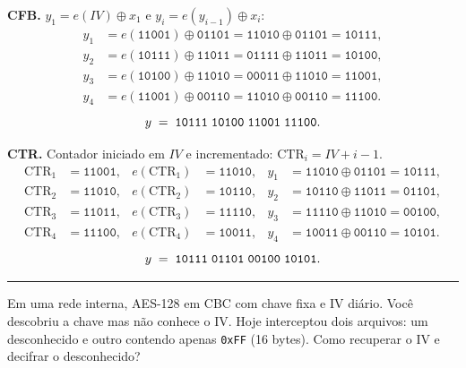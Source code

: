 \documentclass[12pt,a4paper]{article}
\newcommand{\exercicio}[1]{%
    \par\vspace{1.2em}
    \noindent
    {\color{black!55}\rule[-0.25em]{3pt}{1.6em}}%
    \hspace{0.6em}{\Large\bfseries Exerc\'{i}cio #1}
    \par\vspace{-0.4em}
    \noindent{\color{black!35}\rule{\textwidth}{0.4pt}}
    \par\vspace{0.35em}
}
\newenvironment{resposta}{%
    \begin{respostabox}
    \color{red!70!black}\sloppy
}{%
    \end{respostabox}
}
\begin{document}
\begin{resposta}
\textbf{CFB.} $y_1 = e(IV) \oplus x_1$ e $y_i = e(y_{i-1}) \oplus x_i$:
\begin{align*}
y_1 &= e(\texttt{11001})\oplus\texttt{01101} = \texttt{11010}\oplus\texttt{01101} = \texttt{10111},\\
y_2 &= e(\texttt{10111})\oplus\texttt{11011} = \texttt{01111}\oplus\texttt{11011} = \texttt{10100},\\
y_3 &= e(\texttt{10100})\oplus\texttt{11010} = \texttt{00011}\oplus\texttt{11010} = \texttt{11001},\\
y_4 &= e(\texttt{11001})\oplus\texttt{00110} = \texttt{11010}\oplus\texttt{00110} = \texttt{11100}.
\end{align*}
\[
y \;=\; \texttt{10111\;10100\;11001\;11100}.
\]

\textbf{CTR.} Contador iniciado em $IV$ e incrementado: $\mathrm{CTR}_i = IV+i-1$.
\begin{align*}
\mathrm{CTR}_1 &= \texttt{11001}, & e(\mathrm{CTR}_1) &= \texttt{11010}, & y_1 &= \texttt{11010}\oplus\texttt{01101} = \texttt{10111},\\
\mathrm{CTR}_2 &= \texttt{11010}, & e(\mathrm{CTR}_2) &= \texttt{10110}, & y_2 &= \texttt{10110}\oplus\texttt{11011} = \texttt{01101},\\
\mathrm{CTR}_3 &= \texttt{11011}, & e(\mathrm{CTR}_3) &= \texttt{11110}, & y_3 &= \texttt{11110}\oplus\texttt{11010} = \texttt{00100},\\
\mathrm{CTR}_4 &= \texttt{11100}, & e(\mathrm{CTR}_4) &= \texttt{10011}, & y_4 &= \texttt{10011}\oplus\texttt{00110} = \texttt{10101}.
\end{align*}
\[
y \;=\; \texttt{10111\;01101\;00100\;10101}.
\]

\end{resposta}

\exercicio{11}
Em uma rede interna, AES-128 em CBC com chave fixa e IV diário. Você descobriu a chave mas não conhece o IV. Hoje interceptou dois arquivos: um desconhecido e outro contendo apenas \texttt{0xFF} (16 bytes). Como recuperar o IV e decifrar o desconhecido?
\end{document}
